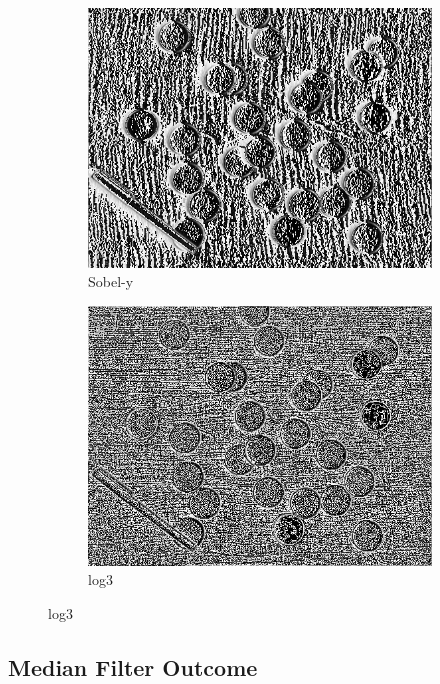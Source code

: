 \documentclass[14pt]{article}
\begin{document}
\begin{figure}[hbt!]
		\begin{subfigure}[b]{0.23\linewidth}
			\includegraphics[width=\linewidth]{k7.png}
			\caption{Sobel-y}
		\end{subfigure}
		\begin{subfigure}[b]{0.23\linewidth}
			\includegraphics[width=\linewidth]{k8.png}
			\caption{log3}
		\end{subfigure}
	\end{figure}

	\subsection{Median Filter Outcome}
\end{document}
